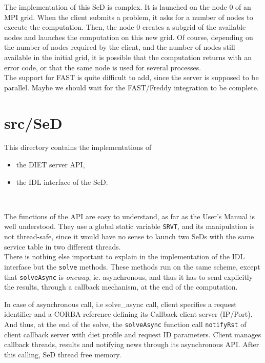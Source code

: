   The implementation of this SeD is complex. It is launched on the node 0 of an
  MPI grid. When the client submits a problem, it asks for a number of nodes to
  execute the computation. Then, the node 0 creates a subgrid of the available
  nodes and launches the computation on this new grid. Of course, depending on the
  number of nodes required by the client, and the number of nodes still available
  in the initial grid, it is possible that the computation returns with an error
  code, or that the same node is used for several processes.
  \\

  The support for FAST is quite difficult to add, since the server is supposed to
  be parallel. Maybe we should wait for the FAST/Freddy integration to be
  complete.



  \section{\textsf{src/SeD}}
  \label{s:SeD}

  This directory contains the implementations of
  \begin{itemize}
  \item the DIET server API,
  \item the IDL interface of the SeD.
  \end{itemize}
  \

  The functions of the API are easy to understand, as far as the User's Manual is
  well understood. They use a global static variable \texttt{SRVT}, and its
  manipulation is not thread-safe, since it would have no sense to launch two SeDs
  with the same service table in two different threads.
  \\

  There is nothing else important to explain in the implementation of the IDL
  interface but the \texttt{solve} methods. These methods run on the same
  scheme, except that \texttt{solveAsync} is \textit{oneway}, ie. asynchronous,
  and thus it has to send explicitly the results, through a callback mechanism, at
  the end of the computation.

  In case of asynchronous call, i.e solve\_async call, client specifies a request
  identifier and a CORBA reference defining its Callback client server (IP/Port).
  And thus, at the end of the solve, the \texttt{solveAsync} function call \texttt{notifyRst}
  of client callback server with diet profile and request ID parameters. Client manages
  callback threads, results and notifying news through its asynchronous API.
  After this calling, SeD thread free memory.


